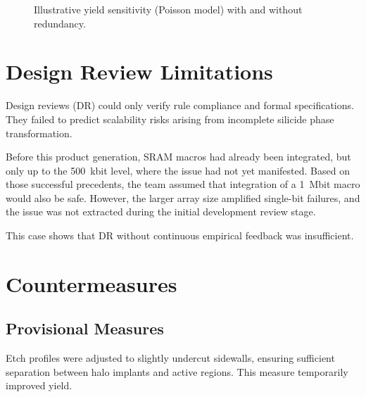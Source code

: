 \documentclass[conference]{IEEEtran}
\begin{document}
\begin{figure}[!t]
  \centering
  \caption{Illustrative yield sensitivity (Poisson model) with and without redundancy.}
  \label{fig:yield}
\end{figure}

\section{Design Review Limitations}
Design reviews (DR) could only verify rule compliance and formal specifications.  
They failed to predict scalability risks arising from incomplete silicide phase transformation.  

Before this product generation, SRAM macros had already been integrated, but only up to the 500~kbit level, where the issue had not yet manifested.  
Based on those successful precedents, the team assumed that integration of a 1~Mbit macro would also be safe.  
However, the larger array size amplified single-bit failures, and the issue was not extracted during the initial development review stage.  

This case shows that DR without continuous empirical feedback was insufficient.

\section{Countermeasures}
\subsection{Provisional Measures}
Etch profiles were adjusted to slightly undercut sidewalls, ensuring sufficient separation between halo implants and active regions.  
This measure temporarily improved yield.
\end{document}
